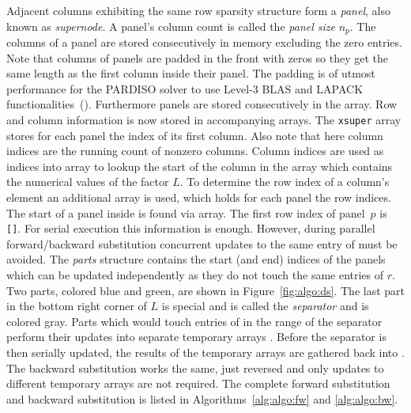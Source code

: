 Adjacent columns exhibiting the same row sparsity structure form a \textit{panel}, also known
as \textit{supernode}.
A panel's column count is called the \textit{panel size} $n_p$.
The columns of a panel are stored consecutively in memory excluding the zero
entries. 
Note that columns of panels are padded in the front with zeros so they get the 
same length as the first column inside their panel. The padding is of utmost performance
for the PARDISO solver to use Level-3 BLAS and LAPACK functionalities~(\cite{20.500.11850/144477}).
 Furthermore panels are stored consecutively in the \vlnz{} array. 
Row and column information is now stored in accompanying arrays.
The \texttt{xsuper} array stores for each panel the index of its first column. 
Also note that here column indices are the running count of nonzero columns.
Column indices are used as indices into \vxlnz{} array to lookup the start of
the column in the \vlnz{} array which contains the numerical values of the factor $L$.
To determine the row index of a column's element an additional array \vindx{} is
used, which holds for each panel the row indices.
The start of a panel inside \vindx{} is found via \vxindx{} array.
The first row index of panel~$p$ is \vindx\texttt{[\vxindx[p]]}.
For serial execution this information is enough. 
However, during parallel forward/backward substitution concurrent updates to
the same entry of \vr{} must be avoided.
The \textit{parts} structure contains the start (and end) indices of the panels which can
be updated independently as they do not touch the same entries of $r$.
Two parts, colored blue and green, are shown in Figure~\ref{fig:algo:ds}.
The last part in the bottom right corner of $L$ is special and is called the 
\textit{separator} and is colored gray.
%
Parts which would touch entries of \vr{} in the range of the separator perform 
their updates into separate temporary arrays \vtemp{}.
Before the separator is then serially updated, the results of the temporary
arrays are gathered back into \vr{}. 
The backward substitution works the same, just reversed and
only updates to different temporary arrays are not required.
The complete forward substitution and backward substitution  is listed in Algorithms~\ref{alg:algo:fw} and \ref{alg:algo:bw}.
%


